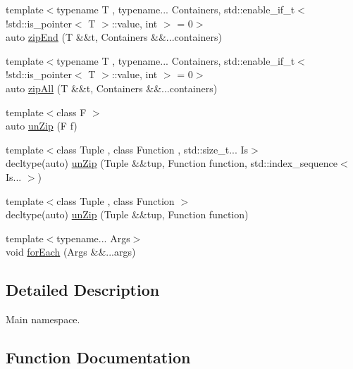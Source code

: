 \begin{DoxyCompactItemize}
\item 
{\footnotesize template$<$typename T , typename... Containers, std\+::enable\+\_\+if\+\_\+t$<$ !std\+::is\+\_\+pointer$<$ T $>$\+::value, int $>$  = 0$>$ }\\auto \hyperlink{namespaceit_a7fb0f903c3b17faa075ebdb35d43dfeb}{zip\+End} (T \&\&t, Containers \&\&...containers)
\item 
{\footnotesize template$<$typename T , typename... Containers, std\+::enable\+\_\+if\+\_\+t$<$ !std\+::is\+\_\+pointer$<$ T $>$\+::value, int $>$  = 0$>$ }\\auto \hyperlink{namespaceit_a1f0d50c802f7ebc349493c21667c366c}{zip\+All} (T \&\&t, Containers \&\&...containers)
\item 
{\footnotesize template$<$class F $>$ }\\auto \hyperlink{namespaceit_a92b0020c9422efb3954750c81d125db8}{un\+Zip} (F f)
\item 
{\footnotesize template$<$class Tuple , class Function , std\+::size\+\_\+t... Is$>$ }\\decltype(auto) \hyperlink{namespaceit_a618ba642582130926aaccb6fee373261}{un\+Zip} (Tuple \&\&tup, Function function, std\+::index\+\_\+sequence$<$ Is... $>$)
\item 
{\footnotesize template$<$class Tuple , class Function $>$ }\\decltype(auto) \hyperlink{namespaceit_a8e31b0601b19400150691b97a2f2b729}{un\+Zip} (Tuple \&\&tup, Function function)
\item 
{\footnotesize template$<$typename... Args$>$ }\\void \hyperlink{namespaceit_a5d544a80e0acee396db704952cec839a}{for\+Each} (Args \&\&...args)
\end{DoxyCompactItemize}


\subsection{Detailed Description}
Main namespace. 

\subsection{Function Documentation}
